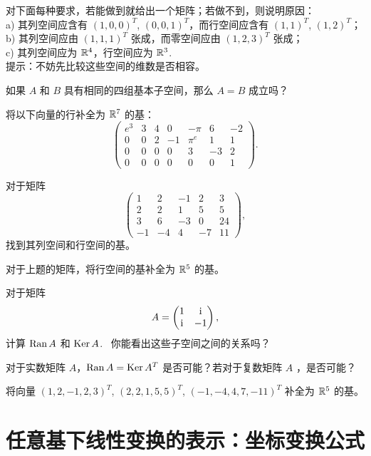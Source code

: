 \begin{problemset}
\item \label{ex:02-07-08} 对下面每种要求，若能做到就给出一个矩阵；若做不到，则说明原因：
\\
a) 其列空间应含有 $(1, 0, 0)^T$, $(0, 0, 1)^T$，而行空间应含有 $(1, 1)^T$, $(1, 2)^T$；
\\
b) 其列空间应由 $(1, 1, 1)^T$ 张成，而零空间应由 $(1, 2, 3)^T$ 张成；
\\
c) 其列空间应为 $\mathbb{R}^4$，行空间应为 $\mathbb{R}^3$. ~
\\
{\heiti 提示}：不妨先比较这些空间的维数是否相容。
\item \label{ex:02-07-09} 如果 $A$ 和 $B$ 具有相同的四组基本子空间，那么 $A = B$ 成立吗？
\item \label{ex:02-07-10} 将以下向量的行补全为 $\mathbb{R}^7$ 的基：
\[
\begin{pmatrix}
e^{3} & 3 & 4 & 0 & -\pi & 6 & -2 \\
0 & 0 & 2 & -1 & \pi^{e} & 1 & 1 \\
0 & 0 & 0 & 0 & 3 & -3 & 2 \\
0 & 0 & 0 & 0 & 0 & 0 & 1
\end{pmatrix}.
\]
\item \label{ex:02-07-11} 对于矩阵 $$ \begin{pmatrix} 1 & 2 & -1 & 2 & 3 \\ 2 & 2 & 1 & 5 & 5 \\ 3 & 6 & -3 & 0 & 24 \\ -1 & -4 & 4 & -7 & 11 \end{pmatrix},$$
找到其列空间和行空间的基。
\item \label{ex:02-07-12} 对于上题的矩阵，将行空间的基补全为 $\mathbb{R}^5$ 的基。
\item \label{ex:02-07-13} 对于矩阵
$$A = \begin{pmatrix} 1 & \rm i \\ \rm i & -1 \end{pmatrix},$$
计算 $\operatorname{Ran} A$ 和 $\operatorname{Ker} A$. ~你能看出这些子空间之间的关系吗？
\item \label{ex:02-07-14} 对于实数矩阵 $A$，$\operatorname{Ran} A = \operatorname{Ker} A^T$ 是否可能？若对于复数矩阵 $A$ ，是否可能？
\item \label{ex:02-07-15} 将向量 $(1, 2, -1, 2, 3)^T$, $(2, 2, 1, 5, 5)^T$, $(-1, -4, 4, 7, -11)^T$ 补全为 $\mathbb{R}^5$ 的基。
\end{problemset}

\section{任意基下线性变换的表示：坐标变换公式}\label{sec:02-08}

